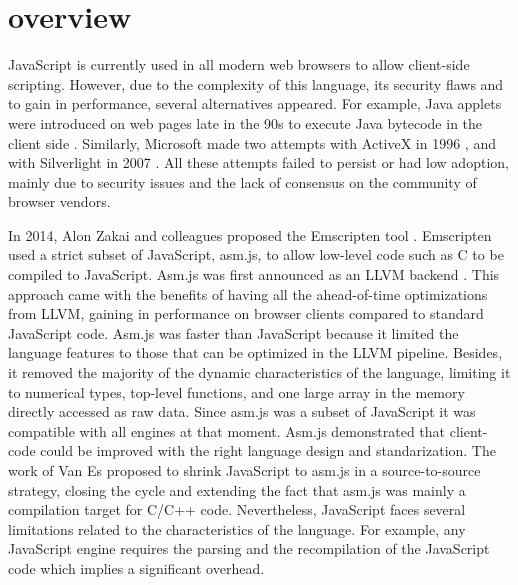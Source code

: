 \section{\wasm overview}
\label{sota:wasm}

\newcommand{\lstnumberautorefname}{Line}
\newcommand{\lineref}[1]{\autoref{#1}}




JavaScript is currently used in all modern web browsers to allow client-side scripting. However, due to the complexity of this language, its security flaws and to gain in performance, several alternatives appeared.  For example, Java applets were introduced on web pages late in the 90s to execute Java bytecode in the client side \cite{javaapplet}. Similarly, Microsoft made two attempts with ActiveX in 1996 \cite{activex}, and with Silverlight in 2007 \cite{silverlight}. All these attempts failed to persist or had low adoption, mainly due to security issues and the lack of consensus on the community of browser vendors.

In 2014, Alon Zakai and colleagues proposed the Emscripten tool \cite{emscripten}. Emscripten used a strict subset of JavaScript, asm.js, to allow low-level code such as C to be compiled to JavaScript. Asm.js was first announced as an LLVM backend \cite{asmjsweb}. This approach came with the benefits of having all the ahead-of-time optimizations from LLVM, gaining in performance on browser clients \cite{asmjs} compared to standard JavaScript code. Asm.js was faster than JavaScript because it limited the language features to those that can be optimized in the LLVM pipeline. Besides, it removed the majority of the dynamic characteristics of the language, limiting it to numerical types, top-level functions, and one large array in the memory directly accessed as raw data. Since asm.js was a subset of JavaScript it was compatible with all engines at that moment. Asm.js demonstrated that client-code could be improved with the right language design and standarization.
The work of Van Es \etal \cite{EsAsm.js} proposed to shrink JavaScript to asm.js in a source-to-source strategy, closing the cycle and extending the fact that asm.js was mainly a compilation target for C/C++ code. 
%
Nevertheless, JavaScript faces several limitations related to the characteristics of the language. For example, any JavaScript engine requires the parsing and the recompilation of the JavaScript code which implies a significant overhead.


